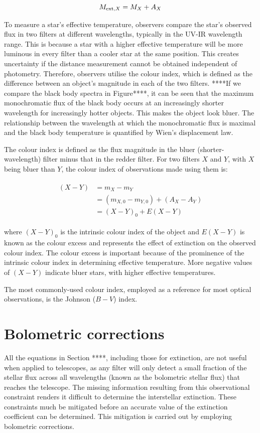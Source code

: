 \documentclass[12pt, a4paper]{report}
\begin{document}
\begin{equation}
M_{\textnormal{ext},X} = M_{X} + A_{X}
\end{equation}

To measure a star's effective temperature, observers compare the star's observed flux in two filters at different wavelengths, typically in the UV-IR wavelength range. This is because a star with a higher effective temperature will be more luminous in every filter than a cooler star at the same position. This creates uncertainty if the distance measurement cannot be obtained independent of photometry. Therefore, observers utilise the colour index, which is defined as the difference between an object's magnitude in each of the two filters. ****If we compare the black body spectra in Figure****, it can be seen that the maximum monochromatic flux of the black body occurs at an increasingly shorter wavelength for increasingly hotter objects. This makes the object look bluer. The relationship between the wavelength at which the monochromatic flux is maximal and the black body temperature is quantified by Wien's displacement law.

The colour index is defined as the flux magnitude in the bluer (shorter-wavelength) filter minus that in the redder filter. For two filters $X$ and $Y$, with $X$ being bluer than $Y$, the colour index of observations made using them is:

\begin{align}
\begin{split}
(X-Y) &= m_{X} - m_{Y} \\
&= (m_{X,0} - m_{Y,0}) + (A_{X} - A_{Y}) \\
&= (X-Y)_{0} + E(X-Y)
\end{split}
\end{align}

where $(X-Y)_{0}$ is the intrinsic colour index of the object and $E(X-Y)$ is known as the colour excess and represents the effect of extinction on the observed colour index. The colour excess is important because of the prominence of the intrinsic colour index in determining effective temperature. More negative values of $(X-Y)$ indicate bluer stars, with higher effective temperatures.

The most commonly-used colour index, employed as a reference for most optical observations, is the Johnson ($B-V$) index.

\section{Bolometric corrections} \label{BC_theory}
All the equations in Section ****, including those for extinction, are not useful when applied to telescopes, as any filter will only detect a small fraction of the stellar flux across all wavelengths (known as the bolometric stellar flux) that reaches the telescope. The missing information resulting from this observational constraint renders it difficult to determine the interstellar extinction. These constraints much be mitigated before an accurate value of the extinction coefficient can be determined. This mitigation is carried out by employing bolometric corrections.
\end{document}
